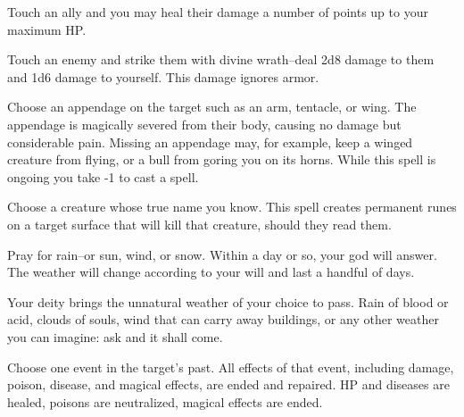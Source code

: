 

Touch an ally and you may heal their damage a number of points up to your maximum HP\@.



Touch an enemy and strike them with divine wrath--deal 2d8 damage to them and 1d6 damage to yourself. This damage ignores armor.

\newpage
{}


Choose an appendage on the target such as an arm, tentacle, or wing. The appendage is magically severed from their body, causing no damage but considerable pain. Missing an appendage may, for example, keep a winged creature from flying, or a bull from goring you on its horns. While this spell is ongoing you take -1 to cast a spell.



Choose a creature whose true name you know. This spell creates permanent runes on a target surface that will kill that creature, should they read them.



Pray for rain--or sun, wind, or snow. Within a day or so, your god will answer. The weather will change according to your will and last a handful of days.



Your deity brings the unnatural weather of your choice to pass. Rain of blood or acid, clouds of souls, wind that can carry away buildings, or any other weather you can imagine: ask and it shall come.



Choose one event in the target's past. All effects of that event, including damage, poison, disease, and magical effects, are ended and repaired. HP and diseases are healed, poisons are neutralized, magical effects are ended.

